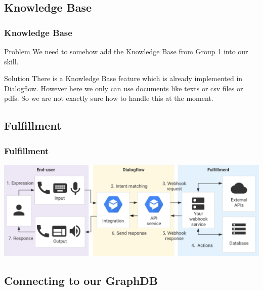 \documentclass{beamer}
\begin{document}

\subsection{Knowledge Base}

\begin{frame}
\frametitle{Knowledge Base}
\begin{block}{Problem}
We need to somehow add the Knowledge Base from Group 1 into our skill.
\end{block}


\begin{block}{Solution}
There is a Knowledge Base feature which is already implemented in Dialogflow. However here we only can use documents like texts or csv files or pdfs. So we are not exactly sure how to handle this at the moment.
\end{block}

\end{frame}


\subsection{Fulfillment}

\begin{frame}
\frametitle{Fulfillment}
\begin{center}
\includegraphics[width=\textwidth]{pictures/fulfillment_flow.png} 
\end{center}
\end{frame}


\subsection{Connecting to our GraphDB}
\end{document}

